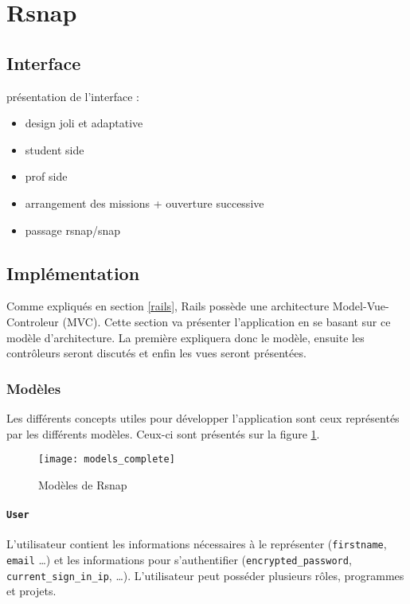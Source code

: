 \section{Rsnap}
\graphicspath{{content/7-solution/3-rsnap/images/}}

\subsection{Interface}
présentation de l'interface :
\begin{itemize}
  \item design joli et adaptative
  \item student side
  \item prof side
  \item arrangement des missions + ouverture successive
  \item passage rsnap/snap
\end{itemize}

\subsection{Implémentation}
Comme expliqués en section \ref{rails}, Rails possède une architecture Model-Vue-Controleur (MVC). Cette section va présenter l'application en se basant sur ce modèle d'architecture. La première expliquera donc le modèle, ensuite les contrôleurs seront discutés et enfin les vues seront présentées.

\subsubsection{Modèles}
Les différents concepts utiles pour développer l'application sont ceux représentés par les différents modèles. Ceux-ci sont présentés sur la figure \ref{fig:models}.

\begin{figure}
 \begin{center}
   \texttt{[image: models\_complete]}
   \caption{Modèles de Rsnap}
   \label{fig:models}
 \end{center}
\end{figure}

\paragraph{\texttt{User}} L'utilisateur contient les informations nécessaires à le représenter (\texttt{firstname}, \texttt{email} \ldots) et les informations pour s'authentifier (\texttt{encrypted\_password}, \texttt{current\_sign\_in\_ip}, \ldots). L'utilisateur peut posséder plusieurs rôles, programmes et projets.

